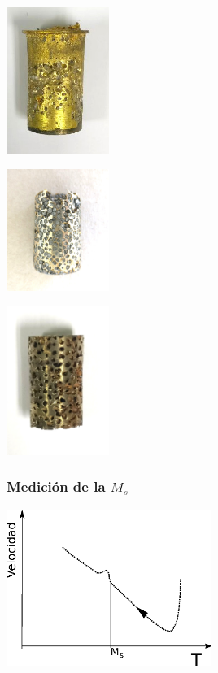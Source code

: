 \documentclass[usenames,dvipsnames]{beamer}
\begin{document}
\begin{frame}
\begin{center}
\begin{multicols}{3}

\includegraphics[width=0.25\textwidth]{img/proceso/proceso1.jpg}

\includegraphics[width=0.25\textwidth]{img/proceso/proceso2.jpg}

\includegraphics[width=0.25\textwidth]{img/proceso/proceso3.jpg}
\end{multicols}

\end{center}
\end{frame}

\begin{frame}
\frametitle{Medición de la $M_s$}

 \includegraphics[width=0.5\textwidth]{img/proceso/Ms.eps}

\end{frame}
\end{document}
